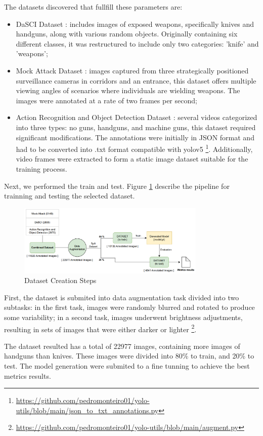 The datasets discovered that fullfill these parameters are:

\begin{itemize}
    \item DaSCI Dataset \cite{rfc29}: includes images of exposed weapons, specifically knives and handguns, along with various 
    random objects. Originally containing six different classes, it was restructured to include only two categories: 
    'knife' and 'weapons';
    \item Mock Attack Dataset \cite{rfc45}: images captured from three strategically positioned surveillance cameras in corridors 
    and an entrance, this dataset offers multiple viewing angles of scenarios where individuals are wielding weapons. 
    The images were annotated at a rate of two frames per second;
    \item Action Recognition and Object Detection Dataset \cite{rfc52}: several videos categorized into three types: no guns, handguns, 
    and machine guns, this dataset required significant modifications. The annotations were initially in JSON 
    format and had to be converted into .txt format compatible with \ac{yolo}v5 \footnote{\url{https://github.com/pedromonteiro01/yolo-utils/blob/main/json\_to\_txt\_annotations.py}}. Additionally, video frames were extracted 
    to form a static image dataset suitable for the training process.
\end{itemize}

Next, we performed the train and test. Figure \ref{fig:dataset-mq} describe the pipeline for trainning  and testing the selected dataset. 

\begin{figure}[h]
    \centering 
    \includegraphics[width=0.8\textwidth]{figs/dataset-creation3.png} 
    \caption{Dataset Creation Steps}
    \label{fig:dataset-mq}
\end{figure}


First, the dataset is submited into data augmentation task divided into two subtasks: in the first task, images were 
randomly blurred and rotated to produce some variability; in a second task, images underwent brightness adjustments,
resulting in sets of images that were either darker or lighter \footnote{\url{https://github.com/pedromonteiro01/yolo-utils/blob/main/augment.py}}.

The dataset resulted has a total of 22977 images, containing more images of handguns than knives. 
These images were divided into 
80\% to train, and 20\% to test. The model generation were submited to a fine tunning to achieve the best metrics results.
